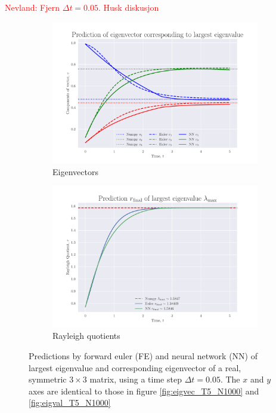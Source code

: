 \documentclass[12pt]{extarticle}
\begin{document}
\textcolor{red}{Nevland: Fjern $\Delta t=0.05$. Husk diskusjon}
\begin{figure}[h]
	\centering
	\begin{subfigure}{0.49\textwidth}
		\centering
		\includegraphics[width=\textwidth]{../output/plots/eigvec_T5_N100.pdf}
		\caption{Eigenvectors}
		\label{fig:eigvec_T5_N100}
	\end{subfigure}
	\hfill
	\begin{subfigure}{0.49\textwidth}
		\centering
		\includegraphics[width=\textwidth]{../output/plots/eigval_T5_N100.pdf}
		\caption{Rayleigh quotients}
		\label{fig:eigval_T5_N100}
	\end{subfigure}
	\caption{Predictions by forward euler (FE) and neural network (NN) of largest eigenvalue and corresponding eigenvector of a real, symmetric $3\times 3$ matrix, using a time step $\Delta t = 0.05$. The $x$ and $y$ axes are identical to those in figure \ref{fig:eigvec_T5_N1000} and \ref{fig:eigval_T5_N1000}}
	\label{fig:eig_T5_N100}
\end{figure}
\end{document}
